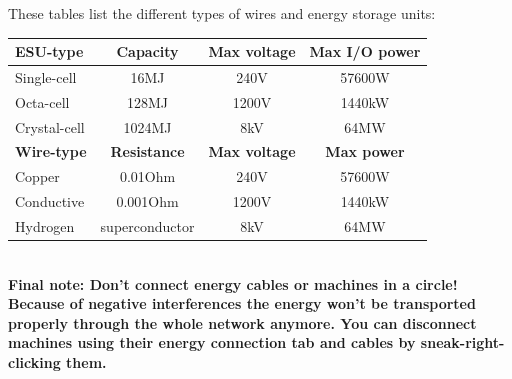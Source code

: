 \documentclass[11pt]{article} %
\begin{document}
These tables list the different types of wires and energy storage units: \\
\begin{tabular}{| l | c | c | c |} \hline
\bf ESU-type & \bf Capacity & \bf Max voltage & \bf Max I/O power \\ \hline
Single-cell & 16MJ & 240V & 57600W \\
Octa-cell & 128MJ & 1200V & 1440kW \\
Crystal-cell & 1024MJ & 8kV & 64MW \\ \hline
\bf Wire-type & \bf Resistance & \bf Max voltage & \bf Max power \\ \hline
Copper & 0.01Ohm & 240V & 57600W \\
Conductive & 0.001Ohm & 1200V & 1440kW \\
Hydrogen & superconductor & 8kV & 64MW \\ \hline
\end{tabular}\\

\bf Final note: Don't connect energy cables or machines in a circle! Because of negative interferences the energy won't be transported properly through the whole network anymore. \rm You can disconnect machines using their energy connection tab and cables by sneak-right-clicking them.
\end{document}
